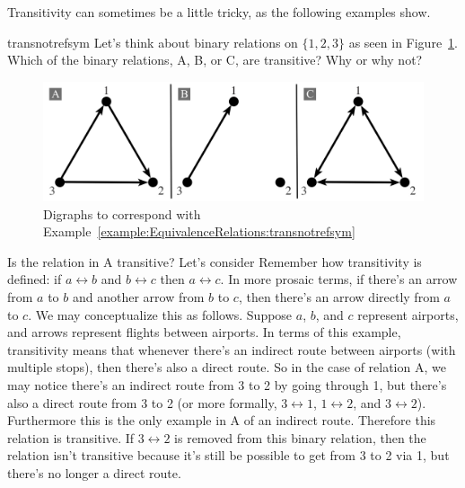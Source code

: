 Transitivity can sometimes be a little tricky, as the following examples show.

\begin{example}{transnotrefsym}
Let's think about binary relations on $\{1,2,3\}$ as seen in Figure~\ref{fig:transnotrefsym}. Which of the binary relations, A, B, or C, are transitive? Why or why not?

\begin{figure}[htpb]
\begin{center}
 \includegraphics[width=5.5in]{images/transnotrefsym.png}
\caption{Digraphs to correspond with Example~\ref{example:EquivalenceRelations:transnotrefsym}\label{fig:transnotrefsym}}
\end{center}
\end{figure}

Is  the relation in A transitive? Let's consider Remember how transitivity is defined:  if $a \rel b$ and $b \rel c$ then  $a \rel c$. In more prosaic terms, if there's an arrow from $a$ to $b$ and another arrow from $b$ to $c$, then there's an arrow directly from $a$ to $c$. We may conceptualize this as follows. Suppose $a$, $b$, and $c$ represent airports, and arrows represent flights between airports.  In terms of this example, transitivity means that whenever there's an indirect route between airports (with multiple stops), then there's also a direct route. So in the case of relation A, we may notice there's an indirect route from 3 to 2 by going through 1, but there's also a direct route from 3 to 2 (or more formally, $3 \rel 1$, $1 \rel 2$, and $3 \rel 2$). Furthermore this is the only example in A of an indirect route. Therefore this relation is transitive. If $3 \rel 2$ is removed from this binary relation, then the relation isn't transitive because it's still be possible to get from 3 to 2 via 1, but there's no longer a direct route.


\end{example}
